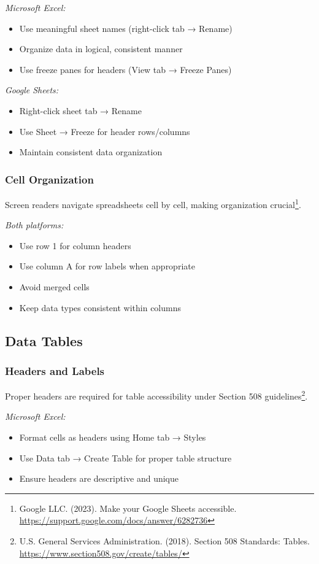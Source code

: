 \emph{Microsoft Excel:}
\begin{itemize}
\item Use meaningful sheet names (right-click tab → Rename)
\item Organize data in logical, consistent manner
\item Use freeze panes for headers (View tab → Freeze Panes)
\end{itemize}

\emph{Google Sheets:}
\begin{itemize}
\item Right-click sheet tab → Rename
\item Use Sheet → Freeze for header rows/columns
\item Maintain consistent data organization
\end{itemize}

\subsubsection{Cell Organization}
Screen readers navigate spreadsheets cell by cell, making organization crucial\footnote{Google LLC. (2023). Make your Google Sheets accessible. \url{https://support.google.com/docs/answer/6282736}}.

\emph{Both platforms:}
\begin{itemize}
\item Use row 1 for column headers
\item Use column A for row labels when appropriate
\item Avoid merged cells
\item Keep data types consistent within columns
\end{itemize}

\subsection{Data Tables}

\subsubsection{Headers and Labels}
Proper headers are required for table accessibility under Section 508 guidelines\footnote{U.S. General Services Administration. (2018). Section 508 Standards: Tables. \url{https://www.section508.gov/create/tables/}}.

\emph{Microsoft Excel:}
\begin{itemize}
\item Format cells as headers using Home tab → Styles
\item Use Data tab → Create Table for proper table structure
\item Ensure headers are descriptive and unique
\end{itemize}


